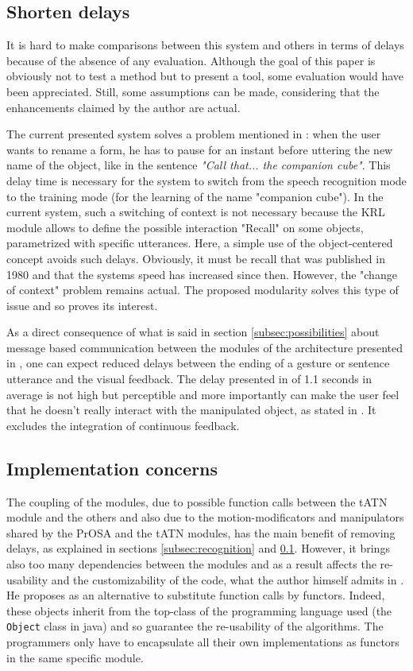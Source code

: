 \documentclass[a4paper]{article}
\begin{document}
\subsection{Shorten delays}
\label{subsec:delays}
It is hard to make comparisons between this system and others in terms of delays because of the absence of any evaluation. Although the goal of this paper is obviously not to test a method but to present a tool, some evaluation would have been appreciated. Still, some assumptions can be made, considering that the enhancements claimed by the author are actual.

The current presented system solves a problem mentioned in \cite{putthatthere}: when the user wants to rename a form, he has to pause for an instant before uttering the new name of the object, like in the sentence \textit{"Call that... the companion cube"}. This delay time is necessary for the system to switch from the speech recognition mode to the training mode (for the learning of the name "companion cube"). In the current system, such a switching of context is not necessary because the KRL module allows to define the possible interaction "Recall" on some objects, parametrized with specific utterances. Here, a simple use of the object-centered concept avoids such delays. Obviously, it must be recall that \cite{putthatthere} was published in 1980 and that the systems speed has increased since then. However, the "change of context" problem remains actual. The proposed modularity solves this type of issue and so proves its interest.

As a direct consequence of what is said in section \ref{subsec:possibilities} about message based communication between the modules of the architecture presented in \cite{kaiser}, one can expect reduced delays between the ending of a gesture or sentence utterance and the visual feedback. The delay presented in \cite{kaiser} of 1.1 seconds in average is not high but perceptible and more importantly can make the user feel that he doesn't really interact with the manipulated object, as stated in \cite{responsetime}. It excludes the integration of continuous feedback.

\subsection{Implementation concerns}
The coupling of the modules, due to possible function calls between the tATN module and the others and also due to the motion-modificators and manipulators shared by the PrOSA and the tATN modules, has the main benefit of removing delays, as explained in sections \ref{subsec:recognition} and \ref{subsec:delays}. However, it brings also too many dependencies between the modules and as a result affects the re-usability and the customizability of the code, what the author himself admits in \cite{hcii}. He proposes as an alternative to substitute function calls by functors. Indeed, these objects inherit from the top-class of the programming language used (the \texttt{Object} class in java) and so guarantee the re-usability of the algorithms. The programmers only have to encapsulate all their own implementations as functors in the same specific module. 
\end{document}
